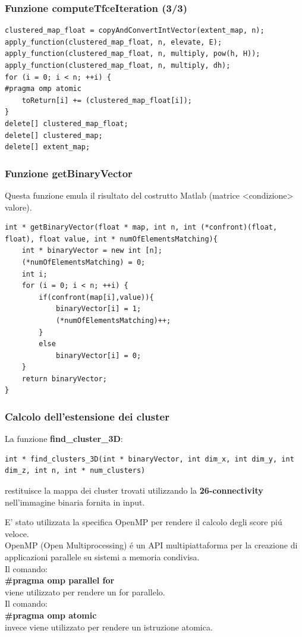 \documentclass{beamer}
\begin{document}
\begin{frame}[fragile]
\frametitle{Funzione computeTfceIteration (3/3)}
\begin{center}
\begin{lstlisting}
clustered_map_float = copyAndConvertIntVector(extent_map, n);
apply_function(clustered_map_float, n, elevate, E);
apply_function(clustered_map_float, n, multiply, pow(h, H));
apply_function(clustered_map_float, n, multiply, dh);
for (i = 0; i < n; ++i) {
#pragma omp atomic
    toReturn[i] += (clustered_map_float[i]);
}
delete[] clustered_map_float;
delete[] clustered_map;
delete[] extent_map;
\end{lstlisting}
\end{center}
\end{frame}

\begin{frame}[fragile]
\frametitle{Funzione getBinaryVector}
Questa funzione emula il risultato del costrutto Matlab (matrice <condizione> valore).
\begin{center}
\begin{lstlisting}
int * getBinaryVector(float * map, int n, int (*confront)(float, float), float value, int * numOfElementsMatching){
    int * binaryVector = new int [n];
    (*numOfElementsMatching) = 0;
    int i;
    for (i = 0; i < n; ++i) {
        if(confront(map[i],value)){
            binaryVector[i] = 1;
            (*numOfElementsMatching)++;
        }
        else
            binaryVector[i] = 0;
    }
    return binaryVector;
}
\end{lstlisting}
\end{center}
\end{frame}

\begin{frame}[fragile]
\frametitle{Calcolo dell'estensione dei cluster}
La funzione \textbf{find\_cluster\_3D}:\\
\begin{lstlisting}
int * find_clusters_3D(int * binaryVector, int dim_x, int dim_y, int dim_z, int n, int * num_clusters)
\end{lstlisting}

restituisce la mappa dei cluster trovati utilizzando la \textbf{26-connectivity} nell'immagine binaria fornita in input.
\end{frame}

\begin{frame}[fragile]
E' stato utilizzata la specifica OpenMP per rendere il calcolo degli score pi\'u veloce.\\
\medskip
OpenMP (Open Multiprocessing) \'e un API multipiattaforma per la creazione di applicazioni parallele su sistemi a memoria condivisa.\\
\smallskip
Il comando:\\
\textbf{\#pragma omp parallel for}\\
viene utilizzato per rendere un for parallelo.\\
\smallskip
Il comando:\\
\textbf{\#pragma omp atomic}\\
invece viene utilizzato per rendere un istruzione atomica.\\
\end{frame}
\end{document}
